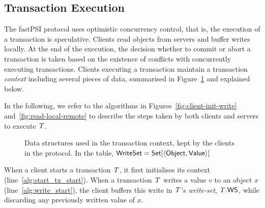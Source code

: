 \subsection{Transaction Execution}
\label{subsect:protocol_execution}

The fastPSI protocol uses optimistic concurrency control, that is, the execution of a transaction is speculative. Clients read objects from servers and buffer writes locally. At the end of the execution, the decision whether to commit or abort a transaction is taken based on the existence of conflicts with concurrently executing transactions. Clients executing a transaction maintain a transaction \emph{context} including several pieces of data, summarised in Figure~\ref{fig:context-variables} and explained below.

In the following, we refer to the algorithms in Figures~\ref{fig:client-init-write} and~\ref{fig:read-local-remote} to describe the steps taken by both clients and servers to execute $\mathit{T}$.

\begin{figure}[h]
\noindent{}
\caption{
  Data structures used in the transaction context, kept by the clients in the protocol. In the table, ${\sf WriteSet} = {\sf Set}[\langle {\sf Object}, {\sf Value} \rangle]$
}
\label{fig:context-variables}
\end{figure}

When a client starts a transaction $\mathit{T}$, it first initialises its context (line~\ref{alg:start_tx_start}). When a transaction $\mathit{T}$ writes a value $v$ to an object $x$ (line~\ref{alg:write_start}), the client buffers this write in $\mathit{T}$'s \emph{write-set}, $\mathit{T}.\mathsf{WS}$, while discarding any previously written value of $x$.

